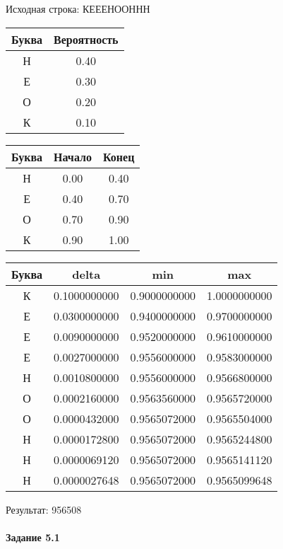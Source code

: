 \documentclass[a4paper, 12pt]{article}
\begin{document}
Исходная строка: КЕЕЕНООННН\
\begin{center}
 \begin{tabular}{ |c|c| } 
  \hline
     Буква & Вероятность \\ \hline
Н & 0.40\\\hline
Е & 0.30\\\hline
О & 0.20\\\hline
К & 0.10
\\ \hline \end{tabular}
\end{center}
\begin{center}
 \begin{tabular}{ |c|c|c| } 
  \hline
     Буква & Начало & Конец \\ \hline
Н & 0.00 & 0.40\\\hline
Е & 0.40 & 0.70\\\hline
О & 0.70 & 0.90\\\hline
К & 0.90 & 1.00
\\ \hline \end{tabular}
\end{center}
\begin{center}
 \begin{tabular}{ |c|c|c|c| } 
  \hline
     Буква & delta & min & max \\ \hline
К & 0.1000000000 & 0.9000000000 & 1.0000000000\\\hline
Е & 0.0300000000 & 0.9400000000 & 0.9700000000\\\hline
Е & 0.0090000000 & 0.9520000000 & 0.9610000000\\\hline
Е & 0.0027000000 & 0.9556000000 & 0.9583000000\\\hline
Н & 0.0010800000 & 0.9556000000 & 0.9566800000\\\hline
О & 0.0002160000 & 0.9563560000 & 0.9565720000\\\hline
О & 0.0000432000 & 0.9565072000 & 0.9565504000\\\hline
Н & 0.0000172800 & 0.9565072000 & 0.9565244800\\\hline
Н & 0.0000069120 & 0.9565072000 & 0.9565141120\\\hline
Н & 0.0000027648 & 0.9565072000 & 0.9565099648
\\ \hline \end{tabular}
\end{center}
Результат: 956508
\pagebreak
\paragraph{Задание 5.1}
\end{document}
